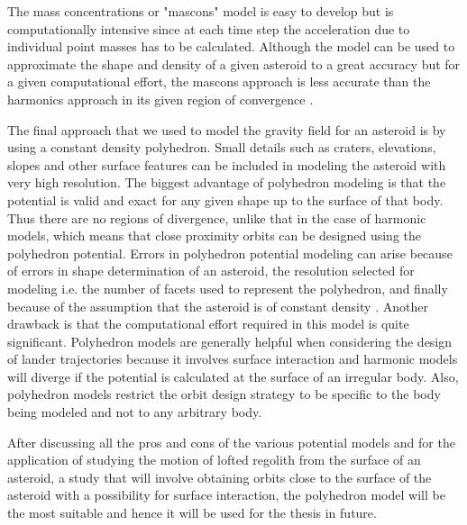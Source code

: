 The mass concentrations or "mascons" model is easy to develop but is computationally intensive since at each time step the acceleration due to individual point masses has to be calculated. Although the model can be used to approximate the shape and density of a given asteroid to a great accuracy but for a given computational effort, the mascons approach is less accurate than the harmonics approach in its given region of convergence \cite{dan_poly}.

The final approach that we used to model the gravity field for an asteroid is by using a constant density polyhedron. Small details such as craters, elevations, slopes and other surface features can be included in modeling the asteroid with very high resolution. The biggest advantage of polyhedron modeling is that the potential is valid and exact for any given shape up to the surface of that body. Thus there are no regions of divergence, unlike that in the case of harmonic models, which means that close proximity orbits can be designed using the polyhedron potential. Errors in polyhedron potential modeling can arise because of errors in shape determination of an asteroid, the resolution selected for modeling i.e. the number of facets used to represent the polyhedron, and finally because of the assumption that the asteroid is of constant density \cite{ellipse_colorado}. Another drawback is that the computational effort required in this model is quite significant. Polyhedron models are generally helpful when considering the design of lander trajectories because it involves surface interaction and harmonic models will diverge if the potential is calculated at the surface of an irregular body. Also, polyhedron models restrict the orbit design strategy to be specific to the body being modeled and not to any arbitrary body.

After discussing all the pros and cons of the various potential models and for the application of studying the motion of lofted regolith from the surface of an asteroid, a study that will involve obtaining orbits close to the surface of the asteroid with a possibility for surface interaction, the polyhedron model will be the most suitable and hence it will be used for the thesis in future.


